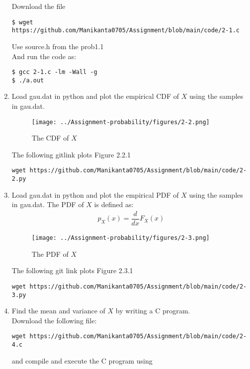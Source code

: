 \documentclass[journal,12pt,twocolumn]{IEEEtran}
\renewcommand\thesection{\arabic{section}}
\begin{document}
\begin{enumerate}[label=\thesection.\arabic*.,ref=\thesection.\theenumi]
    
    \solution Download the file
    \begin{lstlisting}    
$ wget https://github.com/Manikanta0705/Assignment/blob/main/code/2-1.c
    \end{lstlisting}
    Use source.h from the prob1.1\\
    And run the code as:
    \begin{lstlisting}
$ gcc 2-1.c -lm -Wall -g
$ ./a.out
\end{lstlisting}
    \item Load gau.dat in python and plot the empirical CDF of $X$ using the samples in gau.dat.
          \begin{figure}[H]
              \centering
          \texttt{[image: ../Assignment-probability/figures/2-2.png]}
              \caption{The CDF of $X$}
              \label{fig:2-2.png}
          \end{figure}
          \solution The following gitlink plots Figure 2.2.1
          \begin{lstlisting}
wget https://github.com/Manikanta0705/Assignment/blob/main/code/2-2.py
            \end{lstlisting}
    \item Load gau.dat in python and plot the empirical PDF of $X$ using the samples in gau.dat.
          The PDF of $X$ is defined as:
          \begin{align}
              p_{X}(x) = \dfrac{d}{dx}F_{X}(x)
          \end{align}
          \begin{figure}[H]
              \centering
           \texttt{[image: ../Assignment-probability/figures/2-3.png]}
              \caption{The PDF of $X$}
              \label{fig:2-3.png}
          \end{figure}
         \solution The following git link plots Figure 2.3.1
          \begin{lstlisting}
wget https://github.com/Manikanta0705/Assignment/blob/main/code/2-3.py
            \end{lstlisting}
    \item Find the mean and variance of $X$ by writing a C program.
          \\
        \solution Download the following file:
          \begin{lstlisting}
wget https://github.com/Manikanta0705/Assignment/blob/main/code/2-4.c
            \end{lstlisting}
            and compile and execute the C program using

\end{enumerate}
\end{document}

